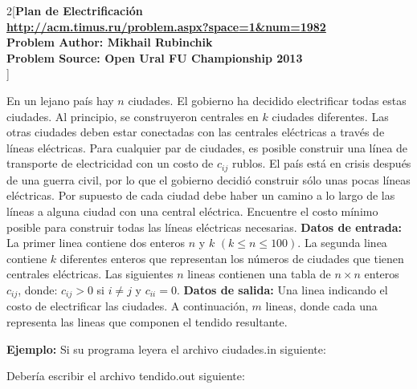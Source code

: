 \documentclass[a4paper,12pt]{article}
\begin{document}
\begin{multicols}{2}[\center\textbf{\large{Plan de Electrificación\\\small{\url{http://acm.timus.ru/problem.aspx?space=1&num=1982}\\Problem Author: Mikhail Rubinchik\\ 
Problem Source: Open Ural FU Championship 2013\\}}}]

\author{}

\justify
En un lejano país hay $n$ ciudades. El gobierno ha decidido electrificar todas estas ciudades. Al principio, se construyeron centrales en $k$ ciudades diferentes. Las otras ciudades deben estar conectadas con las centrales eléctricas a través de líneas eléctricas. Para cualquier par de ciudades, es posible construir una línea de transporte de electricidad con un costo de $c_{ij}$ rublos. El país está en crisis después de una guerra civil, por lo que el gobierno decidió construir sólo unas pocas líneas eléctricas. Por supuesto de cada ciudad debe haber un camino a lo largo de las líneas a alguna ciudad con una central eléctrica. Encuentre el costo mínimo posible para construir todas las líneas eléctricas necesarias.
\justify
\textbf{Datos de entrada:}
La primer linea contiene dos enteros $n$ y $k$ $(k \leq n \leq 100)$.
La segunda linea contiene $k$ diferentes enteros que representan los números de ciudades que tienen centrales eléctricas. 
Las siguientes $n$ lineas contienen una tabla de $n \times n$ enteros $c_{ij}$, donde: $c_{ij} >0$ si $i \not = j$ y $c_{ii} = 0$.
\justify
\textbf{Datos de salida:}
Una linea indicando el costo de electrificar las ciudades.
A continuación, $m$ lineas, donde cada una representa las lineas que componen el tendido resultante. 

\justify
\textbf{Ejemplo:} 
Si su programa leyera el archivo ciudades.in siguiente:\\

\noindent
{}


\justify Debería escribir el archivo tendido.out siguiente:\\

\noindent
{}


\end{multicols}
    

\end{document}
